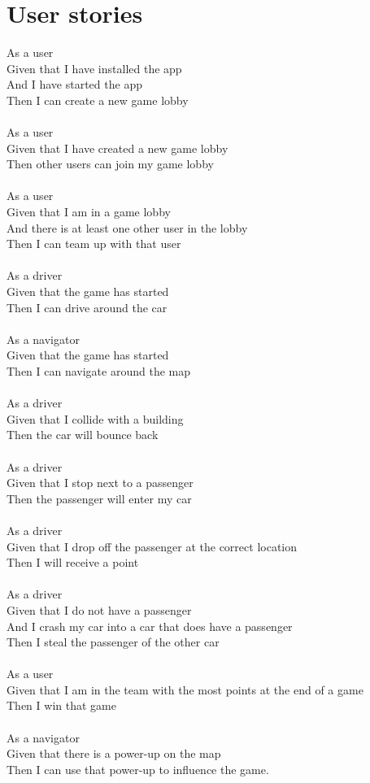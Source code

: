 \documentclass{article}
\begin{document}
\section{User stories}
As a user\\
Given that I have installed the app\\
And I have started the app\\
Then I can create a new game lobby\\\\
As a user\\
Given that I have created a new game lobby\\
Then other users can join my game lobby\\\\
As a  user\\
Given that I am in a game lobby\\
And there is at least one other user in the lobby\\
Then I can team up with that user\\\\
As a driver\\
Given that the game has started\\
Then I can drive around the car\\\\
As a navigator\\
Given that the game has started\\
Then I can navigate around the map\\\\
As a driver\\
Given that I collide with a building\\
Then the car will bounce back\\\\
As a driver\\
Given that I stop next to a passenger\\
Then the passenger will enter my car\\\\
As a driver\\
Given that I drop off the passenger at the correct location\\
Then I will receive a point\\\\
As a driver\\
Given that I do not have a passenger\\
And I crash my car into a car that does have a passenger\\
Then I steal the passenger of the other car\\\\
As a user\\
Given that I am in the team with the most points at the end of a game\\
Then I win that game\\\\
As a navigator\\
Given that there is a power-up on the map\\
Then I can use that power-up to influence the game.\\\\
\end{document}

